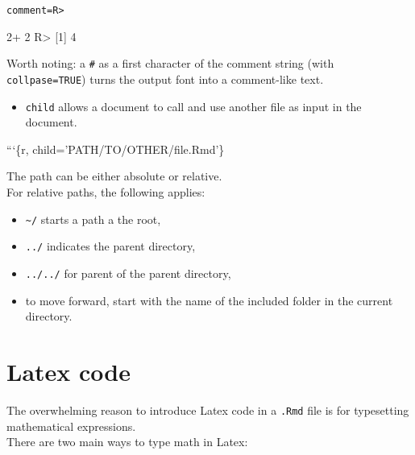 \documentclass[]{book}
\newenvironment{Shaded}{}{}
\newcommand{\BaseNTok}[1]{\textcolor[rgb]{0.25,0.63,0.44}{#1}}
\newcommand{\DecValTok}[1]{\textcolor[rgb]{0.25,0.63,0.44}{#1}}
\newcommand{\NormalTok}[1]{#1}
\newcommand{\OperatorTok}[1]{\textcolor[rgb]{0.40,0.40,0.40}{#1}}
\newcommand{\StringTok}[1]{\textcolor[rgb]{0.25,0.44,0.63}{#1}}
\providecommand{\tightlist}{%
  \setlength{\itemsep}{0pt}\setlength{\parskip}{0pt}}
\theoremstyle{definition}
\theoremstyle{definition}
\theoremstyle{definition}
\theoremstyle{remark}
\begin{document}
\texttt{comment=\textquotesingle{}R\textgreater{}\textquotesingle{}}

\begin{Shaded}
\begin{Highlighting}[]
\DecValTok{2}\OperatorTok{+}\StringTok{ }\DecValTok{2}
\NormalTok{R}\OperatorTok{>}\StringTok{ }\NormalTok{[}\DecValTok{1}\NormalTok{] }\DecValTok{4}
\end{Highlighting}
\end{Shaded}

Worth noting: a \texttt{\#} as a first character of the comment string
(with \texttt{collpase=TRUE}) turns the output font into a comment-like
text.

\begin{itemize}
\tightlist
\item
  \texttt{child} allows a document to call and use another file as input
  in the document.
\end{itemize}

\begin{Shaded}
\begin{Highlighting}[]
\BaseNTok{```\{r, child='PATH/TO/OTHER/file.Rmd'\}}
\end{Highlighting}
\end{Shaded}

The path can be either absolute or relative.\\
For relative paths, the following applies:

\begin{itemize}
\tightlist
\item
  \texttt{\textasciitilde{}/} starts a path a the root,
\item
  \texttt{../} indicates the parent directory,
\item
  \texttt{../../} for parent of the parent directory,
\item
  to move forward, start with the name of the included folder in the
  current directory.
\end{itemize}

\hypertarget{latex-code}{%
\section{Latex code}\label{latex-code}}

The overwhelming reason to introduce Latex code in a \texttt{.Rmd} file
is for typesetting mathematical expressions.\\
There are two main ways to type math in Latex:
\end{document}
